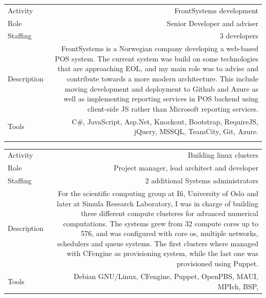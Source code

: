 \documentclass[english,a4paper,11pt]{article}
\begin{document}
\begin{tabular}{@{}LR}
Activity & FrontSystems development \\
Role & Senior Developer and adviser \\
Staffing & 3 developers \\
Description & FrontSystems is a Norwegian company developing a web-based POS system. The current system was build on some technologies that are approaching EOL, and my main role was to advise and contribute towards a more modern architecture. This include moving development and deployment to Github and Azure as well as implementing reporting services in POS backend using client-side JS rather than Microsoft reporting services. \\
Tools & C\#, JavaScript, Asp.Net, Knockout, Bootstrap, RequireJS, jQuery, MSSQL, TeamCity, Git, Azure. \\ 
\addlinespace \bottomrule[.1pt] \addlinespace
\end{tabular}

\begin{tabular}{@{}LR}
Activity & Building linux clusters \\
Role & Project manager, lead architect and developer \\
Staffing & 2 additional Systems administrators \\
Description & For the scientific computing group at Ifi, University of Oslo and later at Simula Research Laboratory, I was in charge of building three different compute clusteres for advanced numerical computations. The systems grew from 32 compute cores up to 576, and was configured with core os, multiple networks, schedulers and queue systems. The first clusters where managed with CFengine as provisioning system, while the last one was provisioned using Puppet. \\
Tools & Debian GNU/Linux, CFengine, Puppet, OpenPBS, MAUI, MPIch, BSP, \\
\end{tabular}
\end{document}
